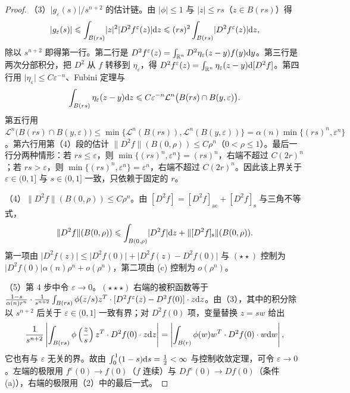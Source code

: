 \documentclass[../../main.tex]{subfiles}%
\begin{document}
\begin{proof}
（3）$\lvert g_{\varepsilon}(s)\rvert/s^{n+2}$ 的估计链。由 $\lvert\phi\rvert\leqslant1$ 与 $\lvert z\rvert\leqslant rs$（$z\in B(rs)$）得
\begin{align*}
\lvert g_{\varepsilon}(s)\rvert\leqslant\int_{B(rs)}\lvert z\rvert^{2}\lvert D^{2}f^{\varepsilon}(z)\rvert\mathrm{d} z\leqslant(rs)^{2}\int_{B(rs)}\lvert D^{2}f^{\varepsilon}(z)\rvert\mathrm{d} z,
\end{align*}
除以 $s^{n+2}$ 即得第一行。第二行是 $D^{2}f^{\varepsilon}(z)=\int_{\mathbb{R}^{n}}D^{2}\eta_{\varepsilon}(z-y)f(y)\mathrm{d} y$。第三行是两次分部积分，把 $D^{2}$ 从 $f$ 转移到 $\eta_{\varepsilon}$，得 $D^{2}f^{\varepsilon}(z)=\int_{\mathbb{R}^{n}}\eta_{\varepsilon}(z-y)\mathrm{d}[D^{2}f]$。第四行用 $\lvert\eta_{\varepsilon}\rvert\leqslant C\varepsilon^{-n}$、Fubini 定理与
\begin{align*}
\int_{B(rs)}\eta_{\varepsilon}(z-y)\mathrm{d} z\leqslant C\varepsilon^{-n}\mathcal{L}^{n}\bigl(B(rs)\cap B(y,\varepsilon)\bigr).
\end{align*}
第五行用 $\mathcal{L}^{n}\bigl(B(rs)\cap B(y,\varepsilon)\bigr)\leqslant\min\{\mathcal{L}^{n}(B(rs)),\mathcal{L}^{n}(B(y,\varepsilon))\}=\alpha(n)\min\{(rs)^{n},\varepsilon^{n}\}$。第六行用第（4）段的估计 $\lVert D^{2}f\rVert(B(0,\rho))\leqslant C\rho^{n}$（$0<\rho\leqslant1$）。最后一行分两种情形：若 $rs\leqslant\varepsilon$，则 $\min\{(rs)^{n},\varepsilon^{n}\}=(rs)^{n}$，右端不超过 $C(2r)^{n}$；若 $rs>\varepsilon$，则 $\min\{(rs)^{n},\varepsilon^{n}\}=\varepsilon^{n}$，右端不超过 $C(2r)^{n}$。因此该上界关于 $\varepsilon\in(0,1]$ 与 $s\in(0,1]$ 一致，只依赖于固定的 $r$。

（4）$\lVert D^{2}f\rVert(B(0,\rho))\leqslant C\rho^{n}$。由 $[D^{2}f]=[D^{2}f]_{\mathrm{ac}}+[D^{2}f]_{\mathrm{s}}$ 与三角不等式，
\begin{align*}
\lVert D^{2}f\rVert(B(0,\rho))\leqslant\int_{B(0,\rho)}\lvert D^{2}f\rvert\mathrm{d} z+\lVert[D^{2}f]_{\mathrm{s}}\rVert(B(0,\rho)).
\end{align*}
第一项由 $\lvert D^{2}f(z)\rvert\leqslant\lvert D^{2}f(0)\rvert+\lvert D^{2}f(z)-D^{2}f(0)\rvert$ 与 $(\star\star)$ 控制为 $\lvert D^{2}f(0)\rvert\alpha(n)\rho^{n}+o(\rho^{n})$，第二项由 (c) 控制为 $o(\rho^{n})$。

（5）第 4 步中令 $\varepsilon\to0$。$(\star\star\star)$ 右端的被积函数等于 $\frac{1-s}{\alpha(n)r^{n}}\cdot\frac{1}{s^{n+2}}\int_{B(rs)}\phi(z/s)z^{T}\cdot[D^{2}f^{\varepsilon}(z)-D^{2}f(0)]\cdot z\mathrm{d} z$。由（3），其中的积分除以 $s^{n+2}$ 后关于 $\varepsilon\in(0,1]$ 一致有界；对 $D^{2}f(0)$ 项，变量替换 $z=sw$ 给出
\begin{align*}
\frac{1}{s^{n+2}}\left|\int_{B(rs)}\phi\left(\frac{z}{s}\right)z^{T}\cdot D^{2}f(0)\cdot z\mathrm{d} z\right|
=\left|\int_{B(r)}\phi(w)w^{T}\cdot D^{2}f(0)\cdot w\mathrm{d} w\right|,
\end{align*}
它也有与 $\varepsilon$ 无关的界。故由 $\int_{0}^{1}(1-s)\mathrm{d} s=\frac{1}{2}<\infty$ 与控制收敛定理，可令 $\varepsilon\to0$。左端的极限用 $f^{\varepsilon}(0)\to f(0)$（$f$ 连续）与 $Df^{\varepsilon}(0)\to Df(0)$（条件 (a)），右端的极限用（2）中的最后一式。


\end{proof}
\end{document}
